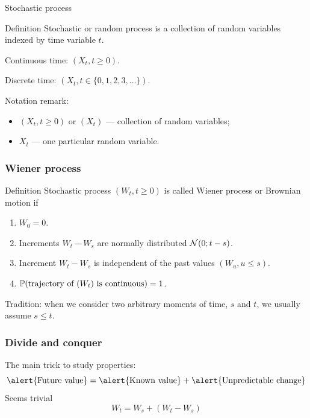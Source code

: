 \begin{frame}{Stochastic process}

  \begin{block}{Definition \formalduck}
    \alert{Stochastic} or \alert{random process} is a collection of random variables indexed by time variable $t$. 
    \pause

    \alert{Continuous time}: $(X_t, t\geq 0)$.
    \pause 
    
    \alert{Discrete time}: $(X_t, t\in \{0, 1, 2, 3, \ldots \})$. 
\end{block}

\pause 
Notation remark:
\begin{itemize}[<+->]
  \item $(X_t, t\geq 0)$ or $(X_t)$ — collection of random variables;
  \item $X_t$ — one particular random variable. 
\end{itemize}


\end{frame}

\begin{frame}
  \frametitle{Wiener process}

  \begin{block}{Definition\formalduck}
    Stochastic process $(W_t, t\geq 0)$ is called \alert{Wiener process} or \alert{Brownian motion} if 
    \pause
    \begin{enumerate}[<+->]
      \item $W_0 = 0$.
      \item Increments $W_t - W_s$ are normally distributed $\cN(0; t-s)$. 
      \item Increment $W_t - W_s$ is independent of the past values $(W_u, u\leq s)$.
      \item $\P(\text{trajectory of } (W_t) \text{ is continuous} ) = 1$.
  \end{enumerate}
  
  \end{block}

  \pause 
  Tradition: when we consider two arbitrary moments of time, $s$ and $t$, we usually assume $s \leq t$. 
\end{frame}

\begin{frame}
  \frametitle{Divide and conquer}

  The main trick to study properties:
  \[
  \text{\alert{Future value}} = \text{\alert{Known value}} + \text{\alert{Unpredictable change}}  
  \]
  \pause 
  Seems trivial\harlequinduck
  \[
  W_t = W_s + (W_t - W_s)  
  \]

\end{frame}


